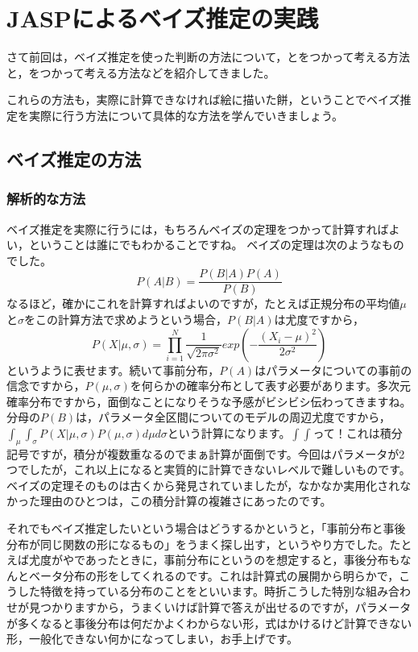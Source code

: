 \documentclass{ltjbook}
\begin{document}
\VerbatimFootnotes
\chapter{JASPによるベイズ推定の実践}
\label{m28_jasp}
さて前回は，ベイズ推定を使った判断の方法について，とをつかって考える方法と，をつかって考える方法などを紹介してきました。

これらの方法も，実際に計算できなければ絵に描いた餅，ということでベイズ推定を実際に行う方法について具体的な方法を学んでいきましょう。
\section{ベイズ推定の方法}
\subsection{解析的な方法}
ベイズ推定を実際に行うには，もちろんベイズの定理をつかって計算すればよい，ということは誰にでもわかることですね。
ベイズの定理は次のようなものでした。
\[ P(A|B) = \frac{P(B|A)P(A)}{P(B)} \]
なるほど，確かにこれを計算すればよいのですが，たとえば正規分布の平均値$\mu$と$\sigma$をこの計算方法で求めようという場合，$P(B|A)$は尤度ですから，
\[ P(X|\mu,\sigma) = \prod_{i=1}^N \frac{1}{\sqrt{2\pi \sigma^2}}exp\left( - \frac{(X_i-\mu)^2}{2\sigma^2}\right) \]
というように表せます。続いて事前分布，$P(A)$はパラメータについての事前の信念ですから，$P(\mu,\sigma)$を何らかの確率分布として表す必要があります。多次元確率分布ですから，面倒なことになりそうな予感がビシビシ伝わってきますね。
分母の$P(B)$は，パラメータ全区間についてのモデルの周辺尤度ですから，$\int_\mu \int_\sigma P(X|\mu,\sigma)P(\mu,\sigma) d\mu d\sigma$という計算になります。$\int \int$って！これは積分記号ですが，積分が複数重なるのでまぁ計算が面倒です。今回はパラメータが2つでしたが，これ以上になると実質的に計算できないレベルで難しいものです。ベイズの定理そのものは古くから発見されていましたが，なかなか実用化されなかった理由のひとつは，この積分計算の複雑さにあったのです。

それでもベイズ推定したいという場合はどうするかというと，「事前分布と事後分布が同じ関数の形になるもの」をうまく探し出す，というやり方でした。たとえば尤度がやであったときに，事前分布にというのを想定すると，事後分布もなんとベータ分布の形をしてくれるのです。これは計算式の展開から明らかで，こうした特徴を持っている分布のことをといいます。時折こうした特別な組み合わせが見つかりますから，うまくいけば計算で答えが出せるのですが，パラメータが多くなると事後分布は何だかよくわからない形，式はかけるけど計算できない形，一般化できない何かになってしまい，お手上げです。
\end{document}
